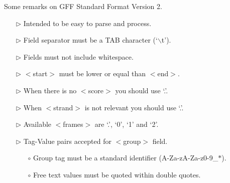 \begin{table}[!ht]
\caption{Some remarks on GFF Standard Format Version 2.}
\label{GFFremarks}
\begin{center}
\begin{mypsframe}
\begin{minipage}[!ht][][c]{0.8\linewidth}
  \begin{itemize}\setlength{\itemsep}{0ex plus0.1ex}
    \item[$\triangleright$] Intended to be easy to parse and process.
    \item[$\triangleright$] Field separator must be a TAB character (`$\backslash$t').
    \item[$\triangleright$] Fields must not include whitespace.
    \item[$\triangleright$] $<$start$>$ must be lower or equal than $<$end$>$.
    \item[$\triangleright$] When there is no $<$score$>$ you should use `.'.
    \item[$\triangleright$] When $<$strand$>$ is not relevant you should use `.'.
    \item[$\triangleright$] Available $<$frames$>$ are `.', `0', `1' and `2'.
    \item[$\triangleright$] Tag-Value pairs accepted for $<$group$>$ field.
	\begin{itemize}
    	\item[$\circ$] Group tag must be a standard identifier (A-Za-zA-Za-z0-9\_$\ast$).
    	\item[$\circ$] Free text values must be quoted within double quotes.
	\end{itemize}
  \end{itemize}
\end{minipage}
\end{mypsframe}
\end{center}
\end{table}

